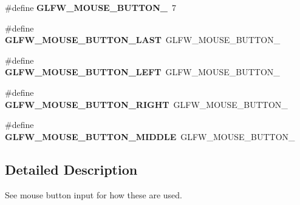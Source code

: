 \begin{DoxyCompactItemize}
\item 
\mbox{\label{group__buttons_ga35d5c4263e0dc0d0a4731ca6c562f32c}} 
\#define {\bfseries G\+L\+F\+W\+\_\+\+M\+O\+U\+S\+E\+\_\+\+B\+U\+T\+T\+O\+N\+\_}~7
\item 
\mbox{\label{group__buttons_gab1fd86a4518a9141ec7bcde2e15a2fdf}} 
\#define {\bfseries G\+L\+F\+W\+\_\+\+M\+O\+U\+S\+E\+\_\+\+B\+U\+T\+T\+O\+N\+\_\+\+L\+A\+ST}~G\+L\+F\+W\+\_\+\+M\+O\+U\+S\+E\+\_\+\+B\+U\+T\+T\+O\+N\+\_
\item 
\mbox{\label{group__buttons_gaf37100431dcd5082d48f95ee8bc8cd56}} 
\#define {\bfseries G\+L\+F\+W\+\_\+\+M\+O\+U\+S\+E\+\_\+\+B\+U\+T\+T\+O\+N\+\_\+\+L\+E\+FT}~G\+L\+F\+W\+\_\+\+M\+O\+U\+S\+E\+\_\+\+B\+U\+T\+T\+O\+N\+\_
\item 
\mbox{\label{group__buttons_ga3e2f2cf3c4942df73cc094247d275e74}} 
\#define {\bfseries G\+L\+F\+W\+\_\+\+M\+O\+U\+S\+E\+\_\+\+B\+U\+T\+T\+O\+N\+\_\+\+R\+I\+G\+HT}~G\+L\+F\+W\+\_\+\+M\+O\+U\+S\+E\+\_\+\+B\+U\+T\+T\+O\+N\+\_
\item 
\mbox{\label{group__buttons_ga34a4d2a701434f763fd93a2ff842b95a}} 
\#define {\bfseries G\+L\+F\+W\+\_\+\+M\+O\+U\+S\+E\+\_\+\+B\+U\+T\+T\+O\+N\+\_\+\+M\+I\+D\+D\+LE}~G\+L\+F\+W\+\_\+\+M\+O\+U\+S\+E\+\_\+\+B\+U\+T\+T\+O\+N\+\_
\end{DoxyCompactItemize}


\subsection{Detailed Description}
See mouse button input for how these are used. 